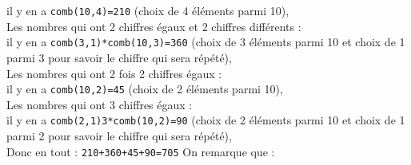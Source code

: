 \documentclass[a4paper,11pt]{book}
\begin{document}
il y en a {\tt comb(10,4)=210} (choix de 4 \'el\'ements parmi 10),\\
Les nombres qui ont 2 chiffres \'egaux et 2 chiffres diff\'erents :\\
il y en a {\tt comb(3,1)*comb(10,3)=360} (choix de 3 \'el\'ements parmi 10 et 
choix de 1 parmi 3 pour savoir le chiffre qui sera r\'ep\'et\'e),\\
Les nombres qui ont 2 fois 2 chiffres \'egaux :\\
il y en a {\tt comb(10,2)=45} (choix de 2 \'el\'ements parmi 10),\\
Les nombres qui ont 3 chiffres \'egaux :\\
il y en a {\tt comb(2,1)3*comb(10,2)=90} (choix de 2 \'el\'ements parmi 10 et 
choix de 1 parmi 2 pour savoir le chiffre qui sera r\'ep\'et\'e),\\
Donc en tout : {\tt 210+360+45+90=705}
On remarque que :
\end{document}
